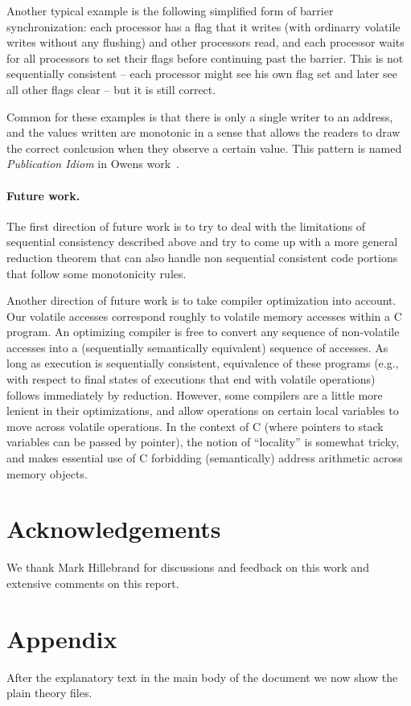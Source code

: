 \documentclass[11pt]{llncs}
\newcommand{\eg}{e.g.,\xspace}
\begin{document}
Another typical example is the following simplified form of
barrier synchronization: each processor has a flag that it writes (with ordinarry volatile writes without any flushing) 
and other processors read, and each processor waits for all processors to
set their flags before continuing past the barrier. This is not
sequentially consistent -- each processor might see his own flag set
and later see all other flags clear -- but it is still correct. 

Common for these examples is that there is only a single writer to an address, 
and the values written are monotonic in a sense that allows the readers to draw the correct conlcusion
when they observe a certain value. This pattern is named  
\emph{Publication Idiom} in Owens work~\cite{Owens-draft}.




\paragraph{Future work.}
The first direction of future work is to try to deal with the limitations
of sequential consistency described above and try to come up with a more general reduction 
theorem that can also handle non sequential consistent code portions that follow some 
monotonicity rules.

Another direction of future work is to take compiler optimization into
account. Our volatile accesses correspond roughly to volatile memory
accesses within a C program. An optimizing compiler is free to convert
any sequence of non-volatile accesses into a (sequentially
semantically equivalent) sequence of accesses. As long as execution is
sequentially consistent, equivalence of these programs (\eg with
respect to final states of executions that end with volatile
operations) follows immediately by reduction. However, some compilers
are a little more lenient in their optimizations, and allow operations
on certain local variables to move across volatile operations. In the
context of C (where pointers to stack variables can be passed by
pointer), the notion of ``locality'' is somewhat tricky, and makes
essential use of C forbidding (semantically) address arithmetic across
memory objects.

\section*{Acknowledgements}
We thank Mark Hillebrand for discussions and feedback on this work and
extensive comments on this report.

\appendix
\section{Appendix}
After the explanatory text in the main body of the document we now show the plain theory files.








%
\end{document}
